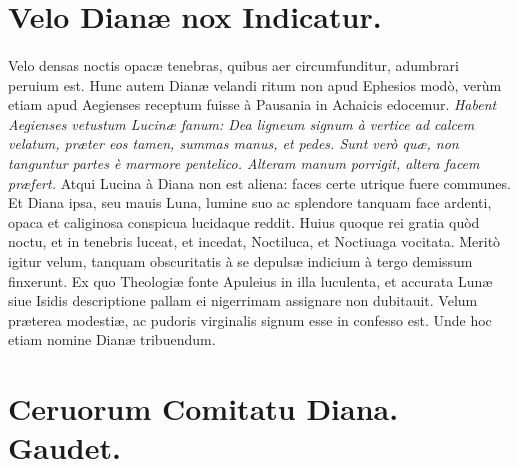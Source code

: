 \documentclass[a4paper, 11pt, oneside, polutonikogreek, latin]{article}
\begin{document}
\section{Velo Dianæ nox Indicatur.}
\paragraph{}
Velo densas noctis opacæ tenebras, quibus aer circumfunditur, adumbrari peruium est. Hunc autem Dianæ velandi ritum non apud Ephesios modò, verùm etiam apud Aegienses receptum fuisse à Pausania in Achaicis edocemur. \emph{Habent Aegienses vetustum Lucinæ fanum: Dea ligneum signum à vertice ad calcem velatum, præter eos tamen, summas manus, et pedes. Sunt verò quæ, non tanguntur partes è marmore pentelico. Alteram manum porrigit, altera facem præfert.} Atqui Lucina à Diana non est aliena: faces certe utrique fuere communes. Et Diana ipsa, seu mauis Luna, lumine suo ac splendore tanquam face ardenti, opaca et caliginosa conspicua lucidaque reddit. Huius quoque rei gratia quòd noctu, et in tenebris luceat, et incedat, Noctiluca, et Noctiuaga vocitata. Meritò igitur velum, tanquam obscuritatis à se depulsæ indicium à tergo demissum finxerunt. Ex quo Theologiæ fonte Apuleius in illa luculenta, et accurata Lunæ siue Isidis descriptione pallam ei nigerrimam assignare non dubitauit. Velum præterea modestiæ, ac pudoris virginalis signum esse in confesso est. Unde hoc etiam nomine Dianæ tribuendum.
\clearpage
\section{Ceruorum Comitatu Diana. Gaudet.}
\end{document}
